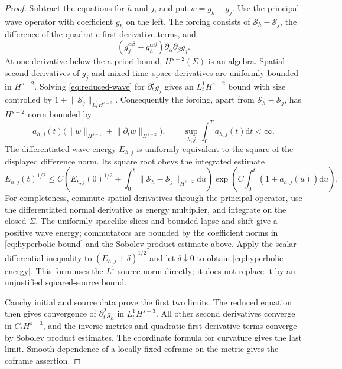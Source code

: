 \documentclass[11pt]{article}
\numberwithin{equation}{section}
\theoremstyle{definition}
\theoremstyle{remark}
\newcommand{\dd}{\mathrm d}
\newcommand{\norm}[1]{\lVert#1\rVert}
\begin{document}
\begin{proof}
Subtract the equations for $h$ and $j$, and put $w=g_h-g_j$. Use the principal wave operator with coefficient $g_h$ on the left. The forcing consists of $\mathcal S_h-\mathcal S_j$, the difference of the quadratic first-derivative terms, and
\[
 (g_j^{\alpha\beta}-g_h^{\alpha\beta})\partial_\alpha\partial_\beta g_j.
\]
At one derivative below the a priori bound, $H^{s-2}(\Sigma)$ is an algebra. Spatial second derivatives of $g_j$ and mixed time--space derivatives are uniformly bounded in $H^{s-2}$. Solving \eqref{eq:reduced-wave} for $\partial_t^2g_j$ gives an $L^1_tH^{s-2}$ bound with size controlled by $1+\norm{\mathcal S_j}_{L^1_tH^{s-2}}$. Consequently the forcing, apart from $\mathcal S_h-\mathcal S_j$, has $H^{s-2}$ norm bounded by
\[
 a_{h,j}(t)\bigl(\norm w_{H^{s-1}}+\norm{\partial_tw}_{H^{s-2}}\bigr),
 \qquad \sup_{h,j}\int_0^T a_{h,j}(t)\dd t<\infty.
\]
The differentiated wave energy $E_{h,j}$ is uniformly equivalent to the square of the displayed difference norm. Its square root obeys the integrated estimate
\begin{equation}
 E_{h,j}(t)^{1/2}
 \le C\left(E_{h,j}(0)^{1/2}
   +\int_0^t\norm{\mathcal S_h-\mathcal S_j}_{H^{s-2}}\dd u\right)
   \exp\!\left(C\int_0^t(1+a_{h,j}(u))\dd u\right).
 \label{eq:hyperbolic-energy}
\end{equation}
For completeness, commute spatial derivatives through the principal operator, use the differentiated normal derivative as energy multiplier, and integrate on the closed $\Sigma$. The uniformly spacelike slices and bounded lapse and shift give a positive wave energy; commutators are bounded by the coefficient norms in \eqref{eq:hyperbolic-bound} and the Sobolev product estimate above. Apply the scalar differential inequality to $(E_{h,j}+\delta)^{1/2}$ and let $\delta\downarrow0$ to obtain \eqref{eq:hyperbolic-energy}. This form uses the $L^1$ source norm directly; it does not replace it by an unjustified squared-source bound.

Cauchy initial and source data prove the first two limits. The reduced equation then gives convergence of $\partial_t^2g_h$ in $L^1_tH^{s-3}$. All other second derivatives converge in $C_tH^{s-3}$, and the inverse metrics and quadratic first-derivative terms converge by Sobolev product estimates. The coordinate formula for curvature gives the last limit. Smooth dependence of a locally fixed coframe on the metric gives the coframe assertion.
\end{proof}
\end{document}
